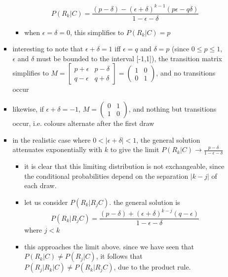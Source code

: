 \documentclass[../jaynes_prob_theory_notes.tex]{subfiles}
\begin{document}
\begin{itemize}
\begin{itemize}
\begin{itemize}
\begin{itemize}
\begin{equation*}
                                    P(R_k|C) = \frac{(p-\delta)-(\epsilon+\delta)^{k-1}(p\epsilon-q\delta)}{1-\epsilon-\delta}
                                    \end{equation*}
                                \item when $\epsilon = \delta = 0$, this simplifies to $P(R_k|C) = p$
                            \end{itemize}
                        \item interesting to note that $\epsilon + \delta = 1$ iff $\epsilon = q$ and $\delta = p$ (since $0 \leq p \leq 1$, $\epsilon$ and $\delta$ must be bounded to the interval [-1,1]), the transition matrix simplifies to $M=\left[ \begin{smallmatrix} p+\epsilon & p-\delta \\ q-\epsilon & q+\delta \end{smallmatrix} \right] = \left(\begin{smallmatrix} 1 & 0 \\ 0 & 1 \end{smallmatrix} \right)$, and no transitions occur
                        \item likewise, if $\epsilon + \delta = -1$, $M = \left(\begin{smallmatrix} 0 & 1 \\ 1 & 0 \end{smallmatrix} \right)$, and nothing but transitions occur, i.e. colours alternate after the first draw
                        \item in the realistic case where $0 < |\epsilon + \delta| < 1$, the general solution attenuates exponentially with $k$ to give the limit $P(R_k|C) \rightarrow \frac{p-\delta}{1-\epsilon-\delta}$
                        \begin{itemize}
                            \item it is clear that this limiting distribution is not exchangeable, since the conditional probabilities depend on the separation $|k-j|$ of each draw.
                            \item let us consider $P(R_k|R_jC)$. the general solution is 
                                \begin{equation*}
                                P(R_k|R_jC) = \frac{(p-\delta) + (\epsilon+\delta)^{k-j}(q-\epsilon)}{1-\epsilon-\delta}
                                \end{equation*}
                                where $j < k$
                            \item this approaches the limit above. since we have seen that $P(R_k|C) \neq P(R_j|C)$, it follows that $P(R_j|R_k|C) \neq P(R_k|R_jC)$, due to the product rule.

\end{itemize}
\end{itemize}
\end{itemize}
\end{itemize}
\end{document}

